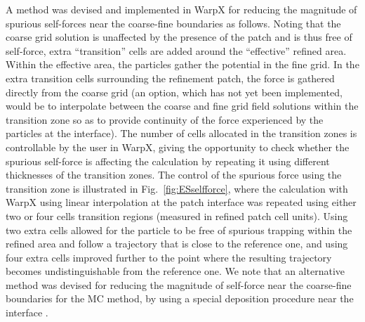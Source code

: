 A method was devised and implemented in WarpX for reducing the magnitude of spurious self-forces near the coarse-fine boundaries as follows. Noting that the coarse grid solution is unaffected by the presence of the patch and is thus free of self-force, extra ``transition'' cells  are added around the ``effective'' refined area.
Within the effective area, the particles gather the potential in the fine grid. In the extra transition cells surrounding the refinement patch, the force is gathered directly from the coarse grid (an option, which has not yet been implemented, would be to interpolate between the coarse and fine grid field solutions within the transition zone so as to provide continuity of the force experienced by the particles at the interface). The number of cells allocated in the transition zones is controllable by the user in WarpX, giving the opportunity to check whether the spurious self-force is affecting the calculation by repeating it using different thicknesses of the transition zones. The control of the spurious force using the transition zone is illustrated in Fig.~\ref{fig:ESselfforce}, where the calculation with WarpX using linear interpolation at the patch interface was repeated using either two or four cells transition regions (measured in refined patch cell units). Using two extra cells allowed for the particle to be free of spurious trapping within the refined area and follow a trajectory that is close to the reference one, and using four extra cells improved further to the point where the resulting trajectory becomes undistinguishable from the reference one.
We note that an alternative method was devised for reducing the magnitude of self-force near the coarse-fine boundaries for the MC method, by using a special deposition procedure near the interface \cite{Colellajcp2010}.


